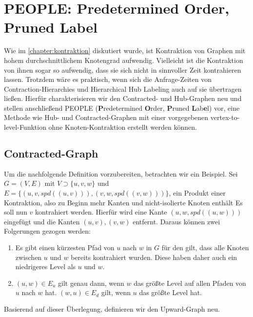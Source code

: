 \chapter{PEOPLE: Predetermined Order, Pruned Label}\label{chapter:peopel}

Wie im \autoref{chapter:kontraktion} diskutiert wurde, ist Kontraktion von Graphen mit hohem durchschnittlichem Knotengrad aufwendig.
Vielleicht ist die Kontraktion von ihnen sogar so aufwendig, dass sie sich nicht in sinnvoller Zeit kontrahieren lassen.
Trotzdem wäre es praktisch, wenn sich die Anfrage-Zeiten von Contraction-Hierarchies und Hierarchical Hub Labeling auch auf sie übertragen ließen.
Hierfür charakterisieren wir den Contracted- und Hub-Graphen neu und stellen anschließend PEOPLE (\textbf{P}redetermined \textbf{O}rder, \textbf{P}runed \textbf{L}ab\textbf{e}l) vor, eine Methode wie Hub- und Contracted-Graphen mit einer vorgegebenen vertex-to-level-Funktion ohne Knoten-Kontraktion erstellt werden können.

\section{Contracted-Graph}

Um die nachfolgende Definition vorzubereiten, betrachten wir ein Beispiel.
Sei $G = (V, E)$ mit $V \supset \{ u, v, w \}$ und $E = \{ (u, v, {spd}((u, v))), (v, w, {spd}((v, w))) \}$, ein Produkt einer Kontraktion, also zu Beginn mehr Kanten und nicht-isolierte Knoten enthält
Es soll nun $v$ kontrahiert werden.
Hierfür wird eine Kante $(u, w, {spd}((u, w)))$ eingefügt und die Kanten $(u, v), (v, w)$ entfernt.
Daraus können zwei Folgerungen gezogen werden:

\begin{enumerate}
  \item
        Es gibt einen kürzesten Pfad von $u$ nach $w$ in $G$ für den gilt, dass alle Knoten zwischen $u$ und $w$ bereits kontrahiert wurden.
        Diese haben daher auch ein niedrigeres Level als $u$ und $w$.

  \item
        $(u, w) \in E_u$ gilt genau dann, wenn $w$ das größte Level auf allen Pfaden von $u$ nach $w$ hat.
        $(w, u) \in E_d$ gilt, wenn $u$ das größte Level hat.
\end{enumerate}

Basierend auf dieser Überlegung, definieren wir den Upward-Graph neu.

